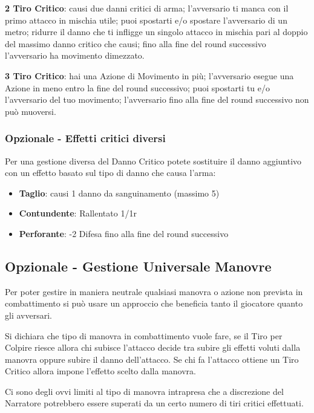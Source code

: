 \begin{multicols}{2}
\textbf{2 Tiro Critico}: causi due danni critici di arma; l'avversario ti manca con il primo attacco in mischia utile; puoi spostarti e/o spostare l'avversario di un metro; ridurre il danno che ti infligge un singolo attacco in mischia pari al doppio del massimo danno critico che causi; fino alla fine del round successivo l'avversario ha movimento dimezzato.

\textbf{3 Tiro Critico}: hai una Azione di Movimento in più; l'avversario esegue una Azione in meno entro la fine del round successivo; puoi spostarti tu e/o l'avversario del tuo movimento; l'avversario fino alla fine del round successivo non può muoversi.

\subsubsection{Opzionale - Effetti critici diversi}\label{effetticriticidiversi}\hypertarget{effetticriticidiversi}{}

Per una gestione diversa del Danno Critico potete sostituire il danno aggiuntivo con un effetto basato sul tipo di danno che causa l'arma:

\begin{itemize}[leftmargin=*] \setlength{\itemsep}{0pt}
	\item \textbf{Taglio}: causi 1 danno da sanguinamento (massimo 5)
	\item \textbf{Contundente}: Rallentato 1/1r
	\item \textbf{Perforante}: -2 Difesa fino alla fine del round successivo
\end{itemize}

\subsection{Opzionale - Gestione Universale Manovre}

Per poter gestire in maniera neutrale qualsiasi manovra o azione non prevista in combattimento si può usare un approccio che beneficia tanto il giocatore quanto gli avversari.

Si dichiara che tipo di manovra in combattimento vuole fare, se il Tiro per Colpire riesce allora chi subisce l'attacco decide tra subire gli effetti voluti dalla manovra oppure subire il danno dell'attacco. Se chi fa l'attacco ottiene un Tiro Critico allora impone l'effetto scelto dalla manovra.

Ci sono degli ovvi limiti al tipo di manovra intrapresa che a discrezione del Narratore potrebbero essere superati da un certo numero di tiri critici effettuati.


\end{multicols}
